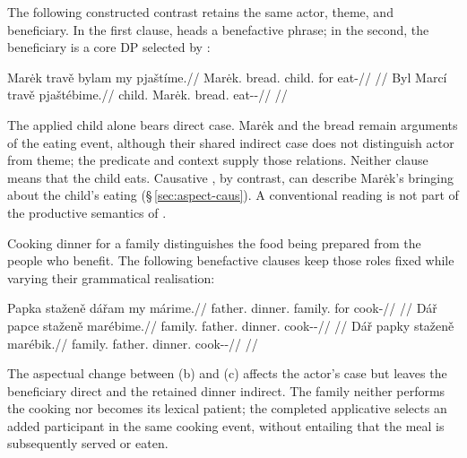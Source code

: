 The following constructed contrast retains the same actor, theme, and
beneficiary. In the first clause,  heads a benefactive phrase; in the
second, the beneficiary is a core DP selected by :

\pex\label{ex:val-appl-transitive}
\a
\begingl
\gla Marėk travě bylam my pjaštíme.//
\glb Marėk.\Dir{} bread.\Ind{} child.\Ind{} for eat-\Prog{}//
\glft {}//
\endgl
\a
\begingl
\gla Byl Marcí travě pjaštébime.//
\glb child.\Dir{} Marėk.\Ind{} bread.\Ind{} eat-\Appl{}-\Prog{}//
\glft {}//
\endgl
\xe

The applied child alone bears direct case. Marėk and the bread remain arguments
of the eating event, although their shared indirect case does not distinguish
actor from theme; the predicate and context supply those relations. Neither
clause means that the child eats. Causative , by contrast,
can describe Marėk's bringing about the child's eating
(§\,\ref{sec:aspect-caus}). A conventional  reading is not part of
the productive semantics of .

Cooking dinner for a family distinguishes the food being prepared from the
people who benefit. The following benefactive clauses keep those roles fixed
while varying their grammatical realisation:

\pex\label{ex:val-slot-benefactive}
\a
\begingl
\gla Papka staženě dářam my márime.//
\glb father.\Dir{} dinner.\Ind{} family.\Ind{} for cook-\Prog{}//
\glft {}
//
\endgl
\a
\begingl
\gla Dář papce staženě marébime.//
\glb family.\Dir{} father.\Ind{} dinner.\Ind{} cook-\Appl{}-\Prog{}//
\glft {}
//
\endgl
\a
\begingl
\gla Dář papky staženě marébik.//
\glb family.\Dir{} father.\Trs{} dinner.\Ind{} cook-\Appl{}-\Pf{}//
\glft {}
//
\endgl
\xe

The aspectual change between (b) and (c) affects the actor's case but leaves
the beneficiary direct and the retained dinner indirect. The family neither
performs the cooking nor becomes its lexical patient; the completed
applicative selects an added participant in the same cooking event, without
entailing that the meal is subsequently served or eaten.

